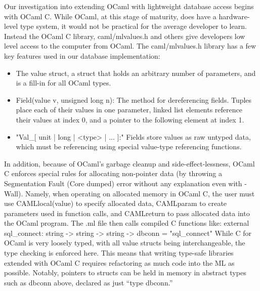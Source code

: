\documentclass[12pt]{article}
\begin{document}
	Our investigation into extending OCaml with lightweight database access begins with OCaml C. While OCaml, at this stage of maturity, does have a hardware-level type system, it would not be practical for the average developer to learn. Instead the OCaml C library, caml/mlvalues.h and others give developers low level access to the computer from OCaml. The caml/mlvalues.h library has a few key features used in our database implementation:
\begin{itemize}

\item The value struct, a struct that holds an arbitrary number of parameters, and is a fill-in for all OCaml types.

\item Field(value v, unsigned long n): The method for dereferencing fields. Tuples place each of their values in one parameter, linked list elements reference their values at index 0, and a pointer to the following element at index 1.
\item "Val\_[ unit | long | <type> | ... ]:" Fields store values as raw untyped data, which must be referencing using special value-type referencing functions.
\end{itemize}
In addition, because of OCaml’s garbage cleanup and side-effect-lessness, OCaml C enforces special rules for allocating non-pointer data (by throwing a Segmentation Fault (Core dumped) error without any explanation even with -Wall). Namely, when operating on allocated memory in OCaml C, the user must use CAMLlocal(value) to specify allocated data, CAMLparam to create parameters used in function calls, and CAMLreturn to pass allocated data into the OCaml program. The .ml file then calls compiled C functions like:
\newline\newline
external sql\_connect: string -> string -> string -> dbconn = "sql\_connect"
\newline\newline
While C for OCaml is very loosely typed, with all value structs being interchangeable, the type checking is enforced here. This means that writing type-safe libraries extended with OCaml C requires refactoring as much code into the ML as possible. Notably, pointers to structs can be held in memory in abstract types such as dbconn above, declared as just “type dbconn.”
\end{document}
